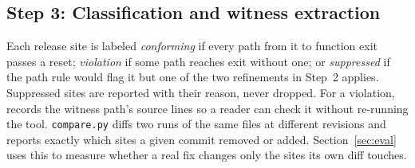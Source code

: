 \subsection{Step 3: Classification and witness extraction}
\label{sec:step3}
Each release site is labeled \emph{conforming} if every path from it to
function exit passes a reset; \emph{violation} if some path reaches exit
without one; or \emph{suppressed} if the path rule would flag it but one
of the two refinements in Step~2 applies. Suppressed sites are reported with their reason, never dropped. For a
violation, \tool records the witness path's source lines so a reader can
check it without re-running the tool. \texttt{compare.py} diffs two runs of the
same files at different revisions and reports exactly which sites a given
commit removed or added. Section~\ref{sec:eval} uses this to measure
whether a real fix changes only the sites its own diff touches.
